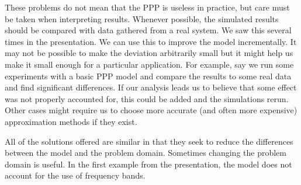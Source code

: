 \documentclass[]{article}
\begin{document}
These problems do not mean that the PPP is useless in practice, but care must be taken when interpreting results. Whenever possible, the simulated results should be compared with data gathered from a real system. We saw this several times in the presentation. We can use this to improve the model incrementally. It may not be possible to make the deviation arbitrarily small but it might help us make it small enough for a particular application. For example, say we run some experiments with a basic PPP model and compare the results to some real data and find significant differences. If our analysis leads us to believe that some effect was not properly accounted for, this could be added and the simulations rerun. Other cases might require us to choose more accurate (and often more expensive) approximation methods if they exist.

All of the solutions offered are similar in that they seek to reduce the differences between the model and the problem domain. Sometimes changing the problem domain is useful. In the first example from the presentation, the model does not account for the use of frequency bands. 
\nocite{kham}
\nocite{randv}
\nocite{ppp}
\nocite{poissond}


\end{document}
